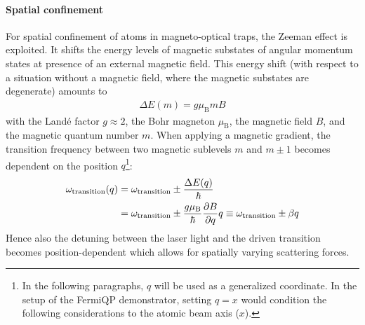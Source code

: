 \paragraph{Spatial confinement} For spatial confinement of atoms in magneto-optical traps, the Zeeman effect is exploited. It shifts the energy levels of magnetic substates of angular momentum states at presence of an external magnetic field. This energy shift (with respect to a situation without a magnetic field, where the magnetic substates are degenerate) amounts to
\begin{align}
    \Delta E(m) = g \mu_\text{B} m B
\end{align}
with the Landé factor $g \approx 2$, the Bohr magneton $\mu_\text{B}$, the magnetic field $B$, and the magnetic quantum number $m$. When applying a magnetic gradient, the transition frequency between two magnetic sublevels $m$ and $m \pm 1$ becomes dependent on the position $q$\footnote{In the following paragraphs, $q$ will be used as a generalized coordinate. In the setup of the FermiQP demonstrator, setting $q = x$ would condition the following considerations to the atomic beam axis ($x$).}:
\begin{equation}
    \begin{split}\label{eq:omega_transition_zeeman}
      \omega_\text{transition}(q) &= \omega_\text{transition} \pm \frac{\Delta E(q)}{\hbar} \\  
      &= \omega_\text{transition} \pm \frac{g \mu_\text{B}}{\hbar} \pdv{B}{q} q \equiv \omega_\text{transition} \pm \beta q
    \end{split}
\end{equation}
Hence also the detuning between the laser light and the driven transition becomes position-dependent which allows for spatially varying scattering forces.

